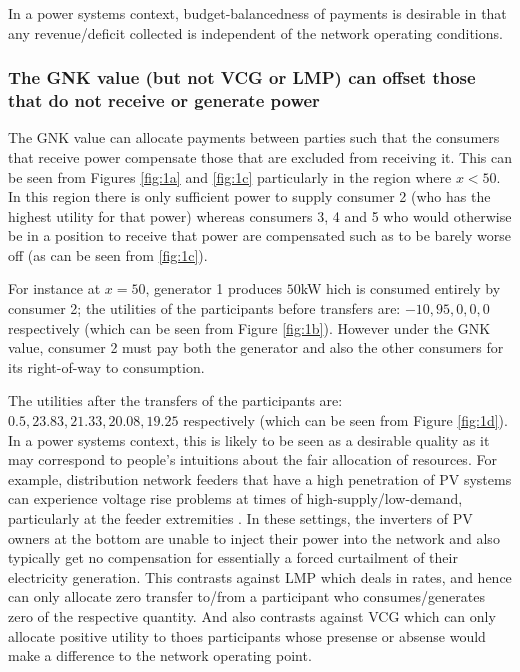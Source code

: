 In a power systems context, budget-balancedness of payments is desirable in that any revenue/deficit collected is independent of the network operating conditions.

\subsubsection*{The GNK value (but not VCG or LMP) can offset those that do not receive or generate power}
The GNK value can allocate payments between parties such that the consumers that receive power compensate those that are excluded from receiving it.
This can be seen from Figures \ref{fig:1a} and \ref{fig:1c} particularly in the region where $x<50$.
In this region there is only sufficient power to supply consumer 2 (who has the highest utility for that power) whereas consumers 3, 4 and 5 who would otherwise be in a position to receive that power are
compensated such as to be barely worse off (as can be seen from \ref{fig:1c}).

For instance at $x=50$, generator 1 produces $50$kW hich is consumed entirely by consumer 2; the utilities of the participants before transfers are: $-10, 95, 0, 0, 0$ respectively (which can be seen from Figure \ref{fig:1b}).
However under the GNK value, consumer 2 must pay both the generator and also the other consumers for its right-of-way to consumption.

The utilities after the transfers of the participants are: $0.5, 23.83, 21.33, 20.08, 19.25$ respectively (which can be seen from Figure \ref{fig:1d}).
In a power systems context, this is likely to be seen as a desirable quality as it may correspond to people's intuitions about the fair allocation of resources.
For example, distribution network feeders that have a high penetration of PV systems can experience voltage rise problems at 
times of high-supply/low-demand, particularly at the feeder extremities \cite{feeder1}. 
In these settings, the inverters of PV owners at the bottom are unable to inject their power into the network and also typically get no compensation for essentially a forced curtailment of their electricity generation.
This contrasts against LMP which deals in rates, and hence can only allocate zero transfer to/from a participant who consumes/generates zero of the respective quantity.
And also contrasts against VCG which can only allocate positive utility to thoes participants whose presense or absense would make a difference to the network operating point.

